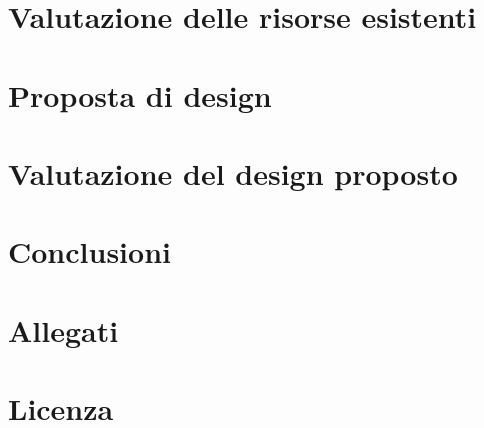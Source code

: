 \documentclass[12pt,a4paper]{report}
\begin{document}
\chapter{Valutazione delle risorse esistenti}
\chapter{Proposta di design}
\chapter{Valutazione del design proposto}
\chapter{Conclusioni}
\chapter{Allegati}
\chapter{Licenza}
\end{document}
